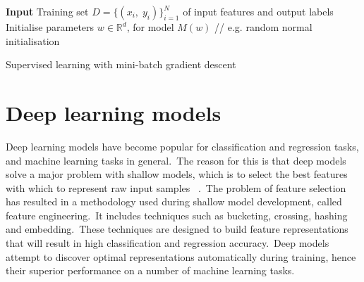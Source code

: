\bigskip

\begin{algorithm}[H]
	\SetAlgoLined
	\textbf{Input} 
	Training set $ D = \{(x_i, \; y_i)\}_{i=1}^N $ of input features and output labels \\
	Initialise parameters $ w \in \mathbb{R}^d $, for model $ M(w) $ // e.g. random normal initialisation \\
	\caption{Supervised learning with mini-batch gradient descent}
\end{algorithm}



\section{Deep learning models}

Deep learning models have become popular for classification and regression tasks, and machine learning tasks in general.\ The reason for this is that deep models solve a major problem with shallow models, which is to select the best features with which to represent raw input samples \unskip ~\citep{Goodfellow-et-al-2016}.\ The problem of feature selection has resulted in a methodology used during shallow model development, called feature engineering.\ It includes techniques such as bucketing, crossing, hashing and embedding.\ These techniques are designed to build feature representations that will result in high classification and regression accuracy.\ Deep models attempt to discover optimal representations automatically during training, hence their superior performance on a number of machine learning tasks. \par

